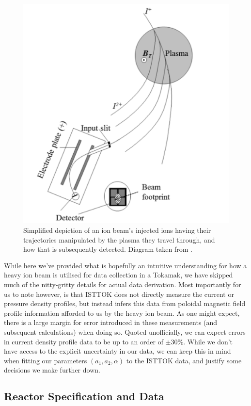 \begin{figure}[h!]
    \centering
    \includegraphics[scale=0.8]{imgs/c5/ion-diagnostics.png}
    \caption{Simplified depiction of an ion beam's injected ions having their trajectories manipulated by the plasma they travel through, and how that is 
    subsequently detected. Diagram taken from \cite{ion-beam-diagnostics}.}
    \label{heavy-ion-beam}
\end{figure}

While here we've provided what is hopefully an intuitive understanding for how a heavy ion beam is utilised for data 
collection in a Tokamak, we have skipped much of the nitty-gritty details for actual data derivation. Most importantly for us to note
however, is that ISTTOK does not directly measure the current or pressure density profiles, but instead 
infers this data from poloidal magnetic field profile information afforded to us by the heavy ion beam. 
As one might expect, there is a large margin for 
error introduced in these measurements (and subsequent calculations) when doing so. Quoted unofficially, we can expect errors in 
current density profile data to be up to an order of $\pm30\%$. While we don't have access to the explicit uncertainty in our data, we can keep this in mind when 
fitting our parameters $(a_1, a_2, \alpha)$ to the ISTTOK data, and justify some decisions we make further down.

\subsection{Reactor Specification and Data}

